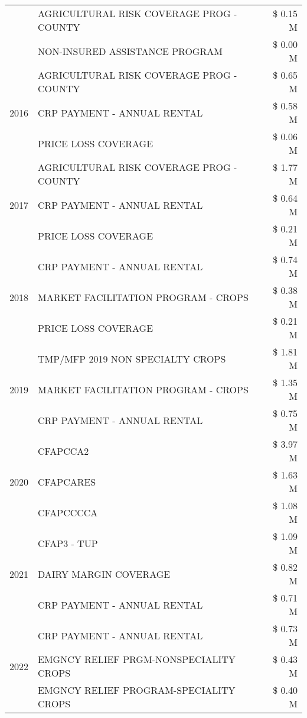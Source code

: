 \begin{tabular}{llr}
 & AGRICULTURAL RISK COVERAGE PROG - COUNTY & \$ 0.15 M \\
 & NON-INSURED ASSISTANCE PROGRAM & \$ 0.00 M \\
\cline{1-3}
\multirow[t]{3}{*}{2016} & AGRICULTURAL RISK COVERAGE PROG - COUNTY & \$ 0.65 M \\
 & CRP PAYMENT - ANNUAL RENTAL & \$ 0.58 M \\
 & PRICE LOSS COVERAGE & \$ 0.06 M \\
\cline{1-3}
\multirow[t]{3}{*}{2017} & AGRICULTURAL RISK COVERAGE PROG - COUNTY & \$ 1.77 M \\
 & CRP PAYMENT - ANNUAL RENTAL & \$ 0.64 M \\
 & PRICE LOSS COVERAGE & \$ 0.21 M \\
\cline{1-3}
\multirow[t]{3}{*}{2018} & CRP PAYMENT - ANNUAL RENTAL & \$ 0.74 M \\
 & MARKET FACILITATION PROGRAM - CROPS & \$ 0.38 M \\
 & PRICE LOSS COVERAGE & \$ 0.21 M \\
\cline{1-3}
\multirow[t]{3}{*}{2019} & TMP/MFP 2019 NON SPECIALTY CROPS & \$ 1.81 M \\
 & MARKET FACILITATION PROGRAM - CROPS & \$ 1.35 M \\
 & CRP PAYMENT - ANNUAL RENTAL & \$ 0.75 M \\
\cline{1-3}
\multirow[t]{3}{*}{2020} & CFAPCCA2 & \$ 3.97 M \\
 & CFAPCARES & \$ 1.63 M \\
 & CFAPCCCCA & \$ 1.08 M \\
\cline{1-3}
\multirow[t]{3}{*}{2021} & CFAP3 - TUP & \$ 1.09 M \\
 & DAIRY MARGIN COVERAGE & \$ 0.82 M \\
 & CRP PAYMENT - ANNUAL RENTAL & \$ 0.71 M \\
\cline{1-3}
\multirow[t]{3}{*}{2022} & CRP PAYMENT - ANNUAL RENTAL & \$ 0.73 M \\
 & EMGNCY RELIEF PRGM-NONSPECIALITY CROPS & \$ 0.43 M \\
 & EMGNCY RELIEF PROGRAM-SPECIALITY CROPS & \$ 0.40 M \\
\cline{1-3}
\bottomrule
\end{tabular}
